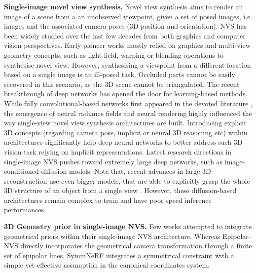 \noindent\textbf{Single-image novel view synthesis.} Novel view synthesis aims to render an image of a scene from a an unobserved viewpoint, given a set of posed images, i.e. images and the associated camera poses (3D position and orientation). NVS has been widely studied over the last few decades from both graphics and computer vision perspectives. Early pioneer works \cite{chen93view,levoy96light,fitzgibbon2005image} mostly relied on graphics and multi-view geometry concepts, such as light field, warping or blending operations to synthesise novel view. However, synthesising a viewpoint from a different location based on a single image is an ill-posed task. Occluded parts cannot be easily recovered in this scenario, as the 3D scene cannot be triangulated. The recent breakthrough of deep networks has opened the door for learning-based methods. While fully convolutional-based networks first appeared in the devoted literature \cite{zhou2016view,sun2018multi,kim2020novel,hou2021novel,guo2022fast,nvs_ours}, the emergence of neural radiance fields \cite{mildenhall2020nerf} and neural rendering \cite{tewari2022advances} highly influenced the way single-view novel view synthesis architectures \cite{pixelnerf,symmnerf,visionnerf} are built. Introducing explicit 3D concepts (regarding camera pose, implicit or neural 3D reasoning etc) within architectures significantly help deep neural networks to better address such 3D vision task relying on implicit representations. Latest research directions in single-image NVS pushes toward extremely large deep networks, such as image-conditioned diffusion models\cite{chen2023single,xiong2023light,chan2023generative,yu2023long}. Note that, recent advances in large 3D reconstruction \cite{hong2023lrm} use even bigger models, that are able to explicitly grasp the whole 3D structure of an object from a single view \cite{liu2023zero,shi2023zero123++,liu2024one,liu2023one2345++,zou2023triplane}. However, these diffusion-based architectures remain complex to train and have poor speed inference performances.  
\newpage

\noindent\textbf{3D Geometry prior in single-image NVS.} Few works attempted to integrate geometrical priors within their single-image NVS architecture. Whereas Epipolar\--NVS \cite{nvs_ours} directly incorporates the geometrical camera transformation through a finite set of epipolar lines, SymmNeRF \cite{symmnerf} integrates a symmetrical constraint with a simple yet effective assumption in the canonical coordinates system. 
\newline

